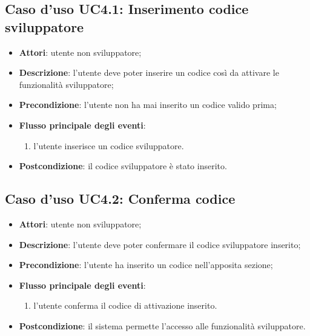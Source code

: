 \documentclass[../AnalisiDeiRequisiti.tex]{subfiles}
\begin{document}
\subsection{Caso d'uso UC4.1: Inserimento codice sviluppatore}
\begin{itemize}
	\item \textbf{Attori}: utente non sviluppatore;
	\item \textbf{Descrizione}: l'utente deve poter inserire un codice così da attivare le funzionalità sviluppatore; 
	\item \textbf{Precondizione}: l'utente non ha mai inserito un codice valido prima;
	
	\item \textbf{Flusso principale degli eventi}:
	\begin{enumerate}
		\item l'utente inserisce un codice sviluppatore.
		
	\end{enumerate}
	\item \textbf{Postcondizione}: il codice sviluppatore è stato inserito.
\end{itemize}
\hypertarget{UC4.2}{}
\subsection{Caso d'uso UC4.2: Conferma codice}
\begin{itemize}
	\item \textbf{Attori}: utente non sviluppatore;
	\item \textbf{Descrizione}: l'utente deve poter confermare il codice sviluppatore inserito; 
	\item \textbf{Precondizione}: l'utente ha inserito un codice nell'apposita sezione;
	
	\item \textbf{Flusso principale degli eventi}:
	\begin{enumerate}
		\item l'utente conferma il codice di attivazione inserito.
		
	\end{enumerate}
	\item \textbf{Postcondizione}: il sistema permette l'accesso alle funzionalità sviluppatore.
\end{itemize}
\hypertarget{UC4.3}{}
\end{document}
